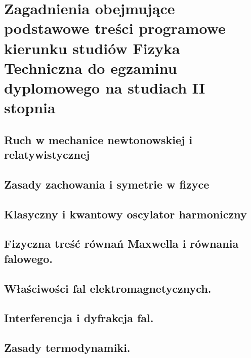 \documentclass[10pt,a4paper]{article} %
\begin{document}
    \pagestyle{plain}
    \title{\rmfamily\normalfont{}}
    \date{} %

    \maketitle

    \tableofcontents

    \section{Zagadnienia obejmujące podstawowe treści programowe kierunku studiów Fizyka Techniczna do egzaminu dyplomowego na studiach II stopnia}
    \subsection{Ruch w mechanice newtonowskiej i relatywistycznej}
    
    \subsection{Zasady zachowania i symetrie w fizyce}
	
	\subsection{Klasyczny i kwantowy oscylator harmoniczny}
	
	\subsection{Fizyczna treść równań Maxwella i równania falowego.}
	
	
	\subsection{Właściwości fal elektromagnetycznych.}
	
	
	\subsection{Interferencja i dyfrakcja fal.}
	
	
	\subsection{Zasady termodynamiki.}
	
	
\end{document}
